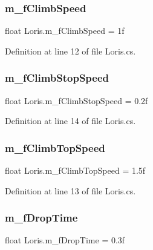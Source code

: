 \subsubsection{\texorpdfstring{m\+\_\+f\+Climb\+Speed}{m\_fClimbSpeed}}
{\footnotesize\ttfamily float Loris.\+m\+\_\+f\+Climb\+Speed = 1f}



Definition at line 12 of file Loris.\+cs.

\mbox{\label{class_loris_afbb9d1bac775eacd615dc1489327f3e8}} 
\subsubsection{\texorpdfstring{m\+\_\+f\+Climb\+Stop\+Speed}{m\_fClimbStopSpeed}}
{\footnotesize\ttfamily float Loris.\+m\+\_\+f\+Climb\+Stop\+Speed = 0.\+2f}



Definition at line 14 of file Loris.\+cs.

\mbox{\label{class_loris_a141ebd60dc9439a00f94affa2d0ec5e7}} 
\subsubsection{\texorpdfstring{m\+\_\+f\+Climb\+Top\+Speed}{m\_fClimbTopSpeed}}
{\footnotesize\ttfamily float Loris.\+m\+\_\+f\+Climb\+Top\+Speed = 1.\+5f}



Definition at line 13 of file Loris.\+cs.

\mbox{\label{class_loris_ae88da935b4f5503437e00306a5c96f10}} 
\subsubsection{\texorpdfstring{m\+\_\+f\+Drop\+Time}{m\_fDropTime}}
{\footnotesize\ttfamily float Loris.\+m\+\_\+f\+Drop\+Time = 0.\+3f}



